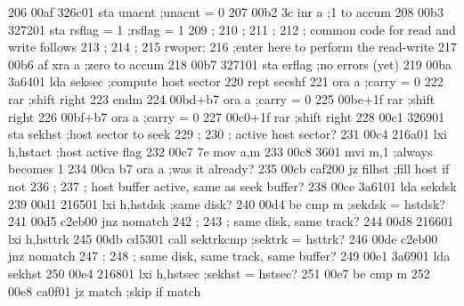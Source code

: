 206    00af 326c01           sta      unacnt                 ;unacnt = 0
207    00b2 3c               inr      a                      ;1 to accum
208    00b3 327201           sta      rsflag = 1             ;rsflag = 1
209                ;
210                ;
211                ;
212                ;         common code for read and write follows
213                ;
214                ;
215                rwoper:
216                          ;enter here to perform the read-write
217    00b6 af               xra      a                      ;zero to accum
218    00b7 327101           sta      erflag                 ;no errors (yet)
219    00ba 3a6401           lda      seksec                 ;compute host sector
220                          rept     secshf
221                          ora      a                      ;carry = 0
222                          rar                             ;shift right
223                          endm
224    00bd+b7               ora      a                      ;carry = 0
225    00be+1f               rar                             ;shift right
226    00bf+b7               ora      a                      ;carry = 0
227    00c0+1f               rar                             ;shift right
228    00c1 326901           sta      sekhst                 ;host sector to seek
229                ;
230                ;         active host sector?
231    00c4 216a01           lxi      h,hstact               ;host active flag
232    00c7 7e               mov      a,m
233    00c8 3601             mvi      m,1                    ;always becomes 1
234    00ca b7               ora      a                      ;was it already?
235    00cb caf200           jz       filhst                 ;fill host if not
236                ;
237                ;         host buffer active, same as seek buffer?
238    00ce 3a6101           lda      sekdsk
239    00d1 216501           lxi      h,hstdsk               ;same disk?
240    00d4 be               cmp      m                      ;sekdsk = hstdsk?
241    00d5 c2eb00           jnz      nomatch
242                ;
243                ;         same disk, same track?
244    00d8 216601           lxi      h,hsttrk
245    00db cd5301           call     sektrkcmp              ;sektrk = hsttrk?
246    00de c2eb00           jnz      nomatch
247                ;
248                ;         same disk, same track, same buffer?
249    00e1 3a6901           lda      sekhst
250    00e4 216801           lxi      h,hstsec               ;sekhst = hstsec?
251    00e7 be               cmp      m
252    00e8 ca0f01           jz       match                  ;skip if match
